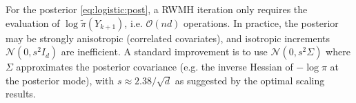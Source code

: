 \documentclass[english,graybox,envcountchap,envcountsame,sectrefs,shortlabels]{svmono}
\theoremstyle{style}
\newcommand{\gauss}{\mathcal{N}}
\begin{document}
\begin{example}
For the posterior \eqref{eq:logistic:post}, a RWMH iteration only requires the evaluation of $\log\tilde\pi(Y_{k+1})$, i.e. $\mathcal{O}(nd)$ operations. In practice, the posterior may be strongly anisotropic (correlated covariates), and isotropic increments $\gauss(0,s^2I_d)$ are inefficient. A standard improvement is to use $\gauss(0,s^2\Sigma)$ where $\Sigma$ approximates the posterior covariance (e.g. the inverse Hessian of $-\log\pi$ at the posterior mode), with $s\approx 2.38/\sqrt{d}$ as suggested by the optimal scaling results.
\end{example}


\end{document}
